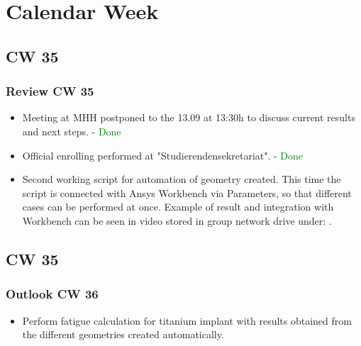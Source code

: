 \section{Calendar Week}
\subsection{CW 35}
\begin{frame}
  \frametitle{Review CW 35}
	\begin{itemize}
		\item Meeting at MHH postponed to the 13.09 at 13:30h to discuss current results and next steps. - \textcolor{green}{Done}
		\item Official enrolling performed at "Studierendensekretariat". - \textcolor{green}{Done}
		\item Second working script for automation of geometry created. This time the script is connected with Ansys Workbench via Parameters, so that different cases can be performed at once. Example of result and integration with Workbench can be seen in video stored in group network drive under: .
	\end{itemize}
\end{frame}

\subsection{CW 35}
\begin{frame}
  \frametitle{Outlook CW 36}
	\begin{itemize}
		\item Perform fatigue calculation for titanium implant with results obtained from the different geometries created automatically.
	\end{itemize}
\end{frame}

